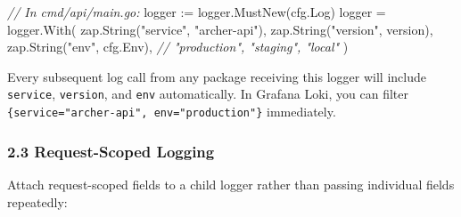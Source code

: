 \documentclass[
]{article}
\newenvironment{Shaded}{}{}
\newcommand{\CommentTok}[1]{\textcolor[rgb]{0.38,0.63,0.69}{\textit{#1}}}
\newcommand{\NormalTok}[1]{#1}
\newcommand{\OperatorTok}[1]{\textcolor[rgb]{0.40,0.40,0.40}{#1}}
\newcommand{\StringTok}[1]{\textcolor[rgb]{0.25,0.44,0.63}{#1}}
\begin{document}
\begin{Shaded}
\begin{Highlighting}[]
\CommentTok{// In cmd/api/main.go:}
\NormalTok{logger }\OperatorTok{:=}\NormalTok{ logger}\OperatorTok{.}\NormalTok{MustNew}\OperatorTok{(}\NormalTok{cfg}\OperatorTok{.}\NormalTok{Log}\OperatorTok{)}
\NormalTok{logger }\OperatorTok{=}\NormalTok{ logger}\OperatorTok{.}\NormalTok{With}\OperatorTok{(}
\NormalTok{    zap}\OperatorTok{.}\NormalTok{String}\OperatorTok{(}\StringTok{"service"}\OperatorTok{,} \StringTok{"archer{-}api"}\OperatorTok{),}
\NormalTok{    zap}\OperatorTok{.}\NormalTok{String}\OperatorTok{(}\StringTok{"version"}\OperatorTok{,}\NormalTok{ version}\OperatorTok{),}
\NormalTok{    zap}\OperatorTok{.}\NormalTok{String}\OperatorTok{(}\StringTok{"env"}\OperatorTok{,}\NormalTok{ cfg}\OperatorTok{.}\NormalTok{Env}\OperatorTok{),} \CommentTok{// "production", "staging", "local"}
\OperatorTok{)}
\end{Highlighting}
\end{Shaded}

Every subsequent log call from any package receiving this logger will
include \texttt{service}, \texttt{version}, and \texttt{env}
automatically. In Grafana Loki, you can filter
\texttt{\{service="archer-api",\ env="production"\}} immediately.

\hypertarget{request-scoped-logging}{%
\subsubsection{2.3 Request-Scoped
Logging}\label{request-scoped-logging}}

Attach request-scoped fields to a child logger rather than passing
individual fields repeatedly:
\end{document}
